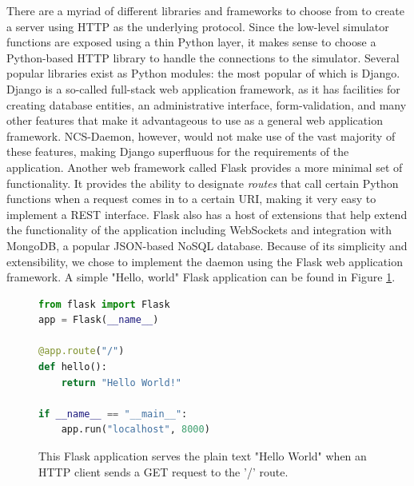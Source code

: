 There are a myriad of different libraries and frameworks to choose from to create a server using HTTP as the underlying protocol. Since the low-level simulator functions are exposed using a thin Python layer, it makes sense to choose a Python-based HTTP library to handle the connections to the simulator. Several popular libraries exist as Python modules: the most popular of which is Django\cite{googletrends2014django}. Django is a so-called full-stack web application framework, as it has facilities for creating database entities, an administrative interface, form-validation, and many other features that make it advantageous to use as a general web application framework. NCS-Daemon, however, would not make use of the vast majority of these features, making Django superfluous for the requirements of the application. Another web framework called Flask\cite{grinberg2014flask} provides a more minimal set of functionality. It provides the ability to designate \emph{routes} that call certain Python functions when a request comes in to a certain URI, making it very easy to implement a REST interface. Flask also has a host of extensions that help extend the functionality of the application including WebSockets and integration with MongoDB, a popular JSON-based NoSQL database. Because of its simplicity and extensibility, we chose to implement the daemon using the Flask web application framework. A simple "Hello, world" Flask application can be found in Figure \ref{fig:flask_hello_world}.

\begin{figure}
\begin{center}
\begin{lstlisting}[language=Python]
from flask import Flask
app = Flask(__name__)

@app.route("/")
def hello():
    return "Hello World!"

if __name__ == "__main__":
    app.run("localhost", 8000)
\end{lstlisting}
\caption[Flask Hello World]{This Flask application serves the plain text "Hello World" when an HTTP client sends a GET request to the '/' route.\label{fig:flask_hello_world}}
\end{center}
\end{figure}

